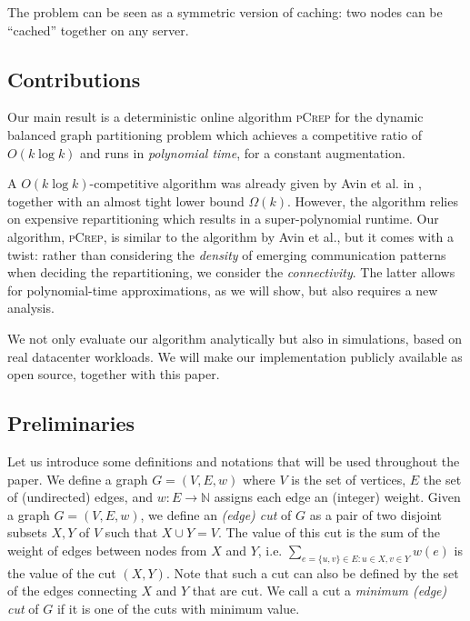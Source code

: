 \documentclass[a4paper,UKenglish,cleveref, autoref, thm-restate,authorcolumns]{lipics-v2019}
\newcommand{\adjDel}{\textsc{pCrep}}
\newcommand{\coreDel}{\text{C{\scriptsize REP}-C{\scriptsize ORE}}}
\begin{document}
The problem can be seen as
a symmetric version of caching: two nodes can be ``cached''
together on any server.

\subsection{Contributions}

Our main result is a deterministic online algorithm \adjDel{}
for the dynamic balanced graph partitioning problem 
which achieves a competitive ratio of $O(k\log k)$
and runs in \emph{polynomial time}, for a constant augmentation. 

A $O(k\log k)$-competitive algorithm was already given by 
Avin et al. in \cite{Avin2016}, together with an almost tight lower bound
$\Omega(k)$. However, the algorithm relies on expensive repartitioning
which results in a super-polynomial runtime.   
Our algorithm, \adjDel{}, is similar to the algorithm by Avin et al.,
but it comes with a twist: rather than considering the \emph{density}
of emerging communication patterns when deciding the repartitioning,
we consider the \emph{connectivity}. The latter allows for polynomial-time
approximations, as we will show, but also requires a new analysis.

We not only evaluate our algorithm analytically but also in simulations,
based on real datacenter workloads. 
We will make our implementation publicly available as open source,
together with this paper.

\subsection{Preliminaries}

Let us introduce some 
definitions and notations 
that will be used throughout the paper.
We define a graph $G=(V, E, w)$ 
where $V$ is the set of vertices,
$E$ the set of (undirected) edges,
and $w:E \rightarrow \mathbb{N}$ assigns each edge an (integer) weight.
Given a graph $G=(V,E,w)$,
we define an \textit{(edge) cut} of $G$ as a pair of 
two disjoint subsets $X,Y$ of $V$ such that $X\cup Y=V$. 
The value of this cut is the sum of the weight of edges between 
nodes from $X$ and $Y$, i.e. $\sum_{e=\{u,v\}\in E:u\in X, v\in Y}w(e)$ is the value of the cut $(X,Y)$. Note that such a cut can also be defined by the set of the edges connecting $X$ and $Y$ that are cut. We call a cut a \textit{minimum (edge) cut} of $G$ if it is one of the cuts with minimum value.
\end{document}
